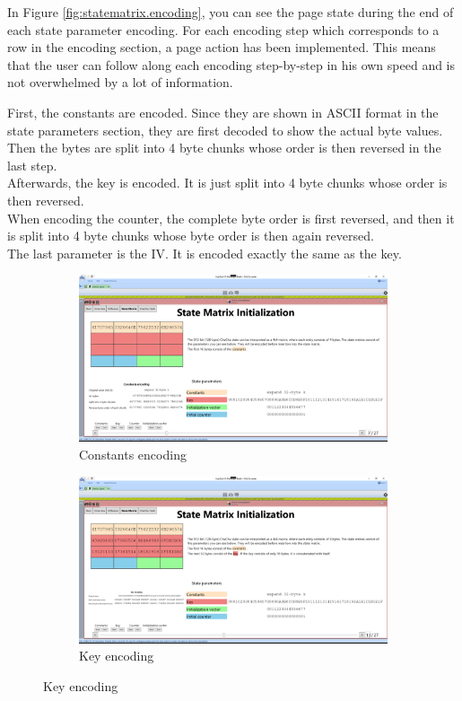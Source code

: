 In Figure \ref{fig:statematrix.encoding}, you can see the page state during the end of each state parameter encoding. For each encoding step which corresponds to a row in the encoding section, a page action has been implemented. This means that the user can follow along each encoding step-by-step in his own speed and is not overwhelmed by a lot of information.

First, the constants are encoded. Since they are shown in ASCII format in the state parameters section, they are first decoded to show the actual byte values. Then the 
bytes are split into 4 byte chunks whose order is then reversed in the last step. \\
Afterwards, the key is encoded. It is just split into 4 byte chunks whose order is then reversed. \\
When encoding the counter, the complete byte order is first reversed, and then it is split into 4 byte chunks whose byte order is then again reversed. \\
The last parameter is the IV. It is encoded exactly the same as the key.

\begin{figure}[!hbt]
\begin{subfigure}{\textwidth}
  \centering
  \includegraphics[width=\textwidth]{figures/ct2/state-matrix/1-state-matrix-constants.png}
  \caption{Constants encoding}
  \label{fig:statematrix.encoding.constants}
\end{subfigure}
\begin{subfigure}{\textwidth}
  \centering
  \includegraphics[width=\textwidth]{figures/ct2/state-matrix/2-state-matrix-key.png}
  \caption{Key encoding}
  \label{fig:statematrix.encoding.key}
\end{subfigure}
\end{figure}

